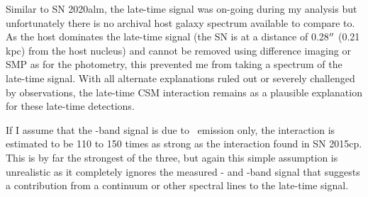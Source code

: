 \documentclass[a4paper,oneside,12pt, class=Latex/Classes/PhDthesisPSnPDF, crop=false]{standalone}
\begin{document}
Similar to SN 2020alm, the late-time signal was on-going during my analysis but unfortunately there is no archival host galaxy spectrum available to compare to. As the host dominates the late-time signal (the SN is at a distance of 0.28$^{\prime\prime}$ (0.21 kpc) from the host nucleus) and cannot be removed using difference imaging or SMP as for the photometry, this prevented me from taking a spectrum of the late-time signal. With all alternate explanations ruled out or severely challenged by observations, the late-time CSM interaction remains as a plausible explanation for these late-time detections. 

If I assume that the \ztfr-band signal is due to \Halpha~emission only, the interaction is estimated to be 110 to 150 times as strong as the interaction found in SN 2015cp. This is by far the strongest of the three, but again this simple assumption is unrealistic as it completely ignores the measured \ztfg- and \ztfi-band signal that suggests a contribution from a continuum or other spectral lines to the late-time signal. 
 
\end{document}
